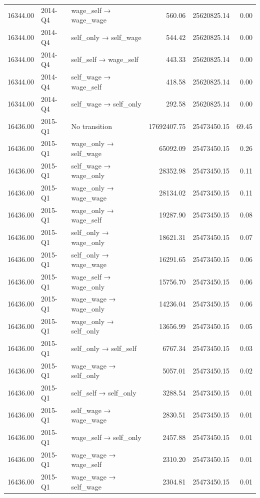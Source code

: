 \begin{table}[ht]
{\begin{tabular}{rllrrr}
  16344.00 & 2014-Q4 & wage\_self → wage\_wage & 560.06 & 25620825.14 & 0.00 \\ 
  16344.00 & 2014-Q4 & self\_only → self\_wage & 544.42 & 25620825.14 & 0.00 \\ 
  16344.00 & 2014-Q4 & self\_self → wage\_self & 443.33 & 25620825.14 & 0.00 \\ 
  16344.00 & 2014-Q4 & self\_wage → wage\_self & 418.58 & 25620825.14 & 0.00 \\ 
  16344.00 & 2014-Q4 & self\_wage → self\_only & 292.58 & 25620825.14 & 0.00 \\ 
  16436.00 & 2015-Q1 & No transition & 17692407.75 & 25473450.15 & 69.45 \\ 
  16436.00 & 2015-Q1 & wage\_only → self\_wage & 65092.09 & 25473450.15 & 0.26 \\ 
  16436.00 & 2015-Q1 & self\_wage → wage\_only & 28352.98 & 25473450.15 & 0.11 \\ 
  16436.00 & 2015-Q1 & wage\_only → wage\_wage & 28134.02 & 25473450.15 & 0.11 \\ 
  16436.00 & 2015-Q1 & wage\_only → wage\_self & 19287.90 & 25473450.15 & 0.08 \\ 
  16436.00 & 2015-Q1 & self\_only → wage\_only & 18621.31 & 25473450.15 & 0.07 \\ 
  16436.00 & 2015-Q1 & self\_only → wage\_wage & 16291.65 & 25473450.15 & 0.06 \\ 
  16436.00 & 2015-Q1 & wage\_self → wage\_only & 15756.70 & 25473450.15 & 0.06 \\ 
  16436.00 & 2015-Q1 & wage\_wage → wage\_only & 14236.04 & 25473450.15 & 0.06 \\ 
  16436.00 & 2015-Q1 & wage\_only → self\_only & 13656.99 & 25473450.15 & 0.05 \\ 
  16436.00 & 2015-Q1 & self\_only → self\_self & 6767.34 & 25473450.15 & 0.03 \\ 
  16436.00 & 2015-Q1 & wage\_wage → self\_only & 5057.01 & 25473450.15 & 0.02 \\ 
  16436.00 & 2015-Q1 & self\_self → self\_only & 3288.54 & 25473450.15 & 0.01 \\ 
  16436.00 & 2015-Q1 & self\_wage → wage\_wage & 2830.51 & 25473450.15 & 0.01 \\ 
  16436.00 & 2015-Q1 & wage\_self → self\_only & 2457.88 & 25473450.15 & 0.01 \\ 
  16436.00 & 2015-Q1 & wage\_wage → wage\_self & 2310.20 & 25473450.15 & 0.01 \\ 
  16436.00 & 2015-Q1 & wage\_wage → self\_wage & 2304.81 & 25473450.15 & 0.01 \\ 

\end{tabular}}
\end{table}
